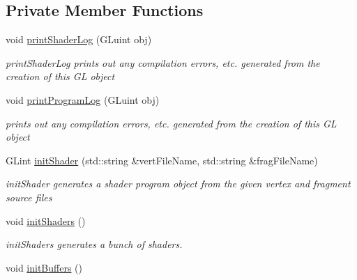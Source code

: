 \subsection*{Private Member Functions}
\begin{DoxyCompactItemize}
\item 
void \hyperlink{classglrenderer_ab90e6a3eca112f7048b36940c6f9f7ab}{print\+Shader\+Log} (G\+Luint obj)
\begin{DoxyCompactList}\small\item\em print\+Shader\+Log prints out any compilation errors, etc. generated from the creation of this G\+L object \end{DoxyCompactList}\item 
void \hyperlink{classglrenderer_ae809cfd8ed84e1596fc2b6295faee1e6}{print\+Program\+Log} (G\+Luint obj)
\begin{DoxyCompactList}\small\item\em prints out any compilation errors, etc. generated from the creation of this G\+L object \end{DoxyCompactList}\item 
G\+Lint \hyperlink{classglrenderer_ac2520771e2459563dcbfc98fb48431c3}{init\+Shader} (std\+::string \&vert\+File\+Name, std\+::string \&frag\+File\+Name)
\begin{DoxyCompactList}\small\item\em init\+Shader generates a shader program object from the given vertex and fragment source files \end{DoxyCompactList}\item 
\hypertarget{classglrenderer_a89899cb659769f33bd8e2610527a421e}{void \hyperlink{classglrenderer_a89899cb659769f33bd8e2610527a421e}{init\+Shaders} ()}\label{classglrenderer_a89899cb659769f33bd8e2610527a421e}

\begin{DoxyCompactList}\small\item\em init\+Shaders generates a bunch of shaders. \end{DoxyCompactList}\item 
\hypertarget{classglrenderer_a55618adb9e0917c835e52a3d256ef1d3}{void \hyperlink{classglrenderer_a55618adb9e0917c835e52a3d256ef1d3}{init\+Buffers} ()}\label{classglrenderer_a55618adb9e0917c835e52a3d256ef1d3}


\end{DoxyCompactItemize}
